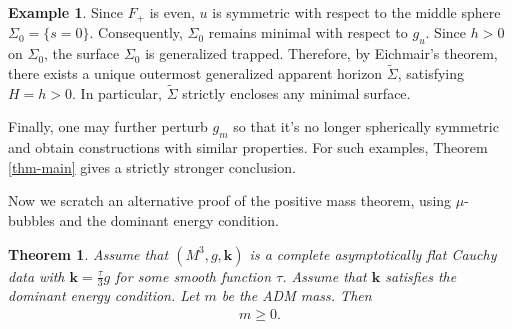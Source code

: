 \documentclass[11pt, letterpaper]{amsart}
\newtheorem{thm}{Theorem}[section]
\theoremstyle{definition}
\newtheorem{exmp}{Example}[section]
\theoremstyle{remark}
\begin{document}
\begin{exmp}
Since $F_{+}$ is even, $u$ is symmetric with respect to the middle sphere $\Sigma _0 = \{s=0\} $. Consequently, $\Sigma _0$ remains minimal with respect to $g_{u}$. Since $h>0 $ on $\Sigma _0$, the surface $\Sigma _0$ is generalized trapped. Therefore, by Eichmair's theorem, there exists a unique outermost generalized apparent horizon $\tilde{\Sigma }$, satisfying $H = h>0$. In particular, $\tilde{\Sigma }$ strictly encloses any minimal surface. 

Finally, one may further perturb $g_{m}$ so that it's no longer spherically symmetric and obtain constructions with similar properties. For such examples, Theorem \ref{thm-main} gives a strictly stronger conclusion. 

\end{exmp}


Now we scratch an alternative proof of the positive mass theorem, using $\mu $-bubbles and the dominant energy condition.
\begin{thm}
	Assume that $(M^3, g, \mathbf{k})$ is a complete asymptotically flat Cauchy data with $\mathbf{k} = \frac{\tau }{3}g$ for some smooth function $\tau $. Assume that $\mathbf{k}$ satisfies the dominant energy condition.
Let $m$ be the ADM mass.
Then
\begin{align*}
	m \geq 0.
\end{align*}  

\end{thm}
\end{document}
